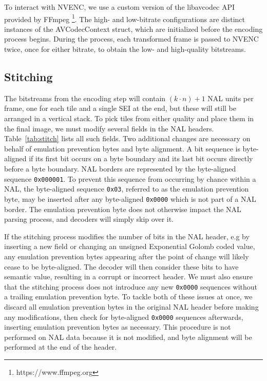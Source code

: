 To interact with NVENC, we use a custom version of the libavcodec API provided by FFmpeg \footnote{https://www.ffmpeg.org}. The high- and low-bitrate configurations are distinct instances of the AVCodecContext struct, which are initialized before the encoding process begins. During the process, each transformed frame is passed to NVENC twice, once for either bitrate, to obtain the low- and high-quality bitstreams.

\subsection{Stitching}

The bitstreams from the encoding step will contain $(k \cdot n)+1$ NAL units per frame, one for each tile and a single SEI at the end, but these will still be arranged in a vertical stack. To pick tiles from either quality and place them in the final image, we must modify several fields in the NAL headers. Table~\ref{tab:stitch} lists all such fields. Two additional changes are necessary on behalf of emulation prevention bytes and byte alignment. A bit sequence is byte-aligned if its first bit occurs on a byte boundary and its last bit occurs directly before a byte boundary. NAL borders are represented by the byte-aligned sequence \texttt{0x000001}. To prevent this sequence from occurring by chance within a NAL, the byte-aligned sequence \texttt{0x03}, referred to as the emulation prevention byte, may be inserted after any byte-aligned \texttt{0x0000} which is not part of a NAL border. The emulation prevention byte does not otherwise impact the NAL parsing process, and decoders will simply skip over it.

If the stitching process modifies the number of bits in the NAL header, e.g by inserting a new field or changing an unsigned Exponential Golomb coded value, any emulation prevention bytes appearing after the point of change will likely cease to be byte-aligned. The decoder will then consider these bits to have semantic value, resulting in a corrupt or incorrect header. We must also ensure that the stitching process does not introduce any new \texttt{0x0000} sequences without a trailing emulation prevention byte. To tackle both of these issues at once, we discard all emulation prevention bytes in the original NAL header before making any modifications, then check for byte-aligned \texttt{0x0000} sequences afterwards, inserting emulation prevention bytes as necessary. This procedure is not performed on NAL data because it is not modified, and byte alignment will be performed at the end of the header.

